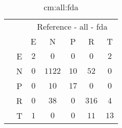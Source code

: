 \begin{table}[!ht]
	\centering
	\begin{tabular}{|c|c|c|c|c|c|c|}
		\cline{3-7}
		\multicolumn{2}{c|}{} & \multicolumn{5}{|c|}{Reference - all - fda} \\ \cline{3-7}
		\multicolumn{2}{c|}{} & E & N & P & R & T \\ \hline
		\multirow{5}{*}{\rotatebox{90}{Prediction}} & E & $2$ & $0$ & $0$ & $0$ & $2$ \\ \cline{2-7}
		 & N & $0$ & $1122$ & $10$ & $52$ & $0$ \\ \cline{2-7}
		 & P & $0$ & $10$ & $17$ & $0$ & $0$ \\ \cline{2-7}
		 & R & $0$ & $38$ & $0$ & $316$ & $4$ \\ \cline{2-7}
		 & T & $1$ & $0$ & $0$ & $11$ & $13$ \\ \hline
	\end{tabular}
	\caption{cm:all:fda}
	\label{tab:cm:all:fda}
\end{table}
